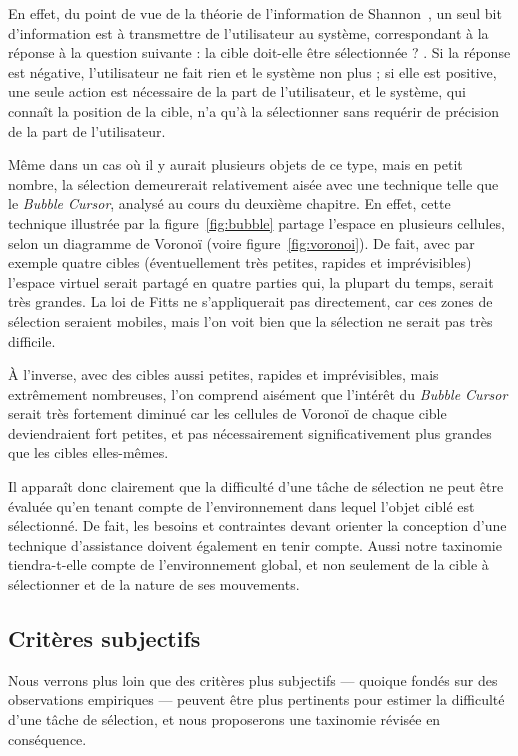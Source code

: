 	En effet, du point de vue de la théorie de l'information de Shannon~\cite{shannon2001mathematical}, un seul bit d'information est à transmettre de l'utilisateur au système, correspondant à la réponse à la question suivante : \og la cible doit-elle être sélectionnée ? \fg{}. Si la réponse est négative, l'utilisateur ne fait rien et le système non plus ; si elle est positive, une seule action est nécessaire de la part de l'utilisateur, et le système, qui connaît la position de la cible, n'a qu'à la sélectionner sans requérir de précision de la part de l'utilisateur.
	
	Même dans un cas où il y aurait plusieurs objets de ce type, mais en petit nombre, la sélection demeurerait relativement aisée avec une technique telle que le \emph{Bubble Cursor}, analysé au cours du deuxième chapitre. En effet, cette technique illustrée par la figure~\ref{fig:bubble} partage l'espace en plusieurs cellules, selon un diagramme de Voronoï (voire figure~\ref{fig:voronoi}). De fait, avec par exemple quatre cibles (éventuellement très petites, rapides et imprévisibles) l'espace virtuel serait partagé en quatre parties qui, la plupart du temps, serait très grandes. La loi de Fitts ne s'appliquerait pas directement, car ces zones de sélection seraient mobiles, mais l'on voit bien que la sélection ne serait pas très difficile.
	
	À l'inverse, avec des cibles aussi petites, rapides et imprévisibles, mais extrêmement nombreuses, l'on comprend aisément que l'intérêt du \emph{Bubble Cursor} serait très fortement diminué car les cellules de Voronoï de chaque cible deviendraient fort petites, et pas nécessairement significativement plus grandes que les cibles elles-mêmes.
	
	Il apparaît donc clairement que la difficulté d'une tâche de sélection ne peut être évaluée qu'en tenant compte de l'environnement dans lequel l'objet ciblé est sélectionné. De fait, les besoins et contraintes devant orienter la conception d'une technique d'assistance doivent également en tenir compte. Aussi notre taxinomie tiendra-t-elle compte de l'environnement global, et non seulement de la cible à sélectionner et de la nature de ses mouvements.
	
	\subsection{Critères subjectifs}
	Nous verrons plus loin que des critères plus subjectifs --- quoique fondés sur des observations empiriques --- peuvent être plus pertinents pour estimer la difficulté d'une tâche de sélection, et nous proposerons une taxinomie révisée en conséquence.

